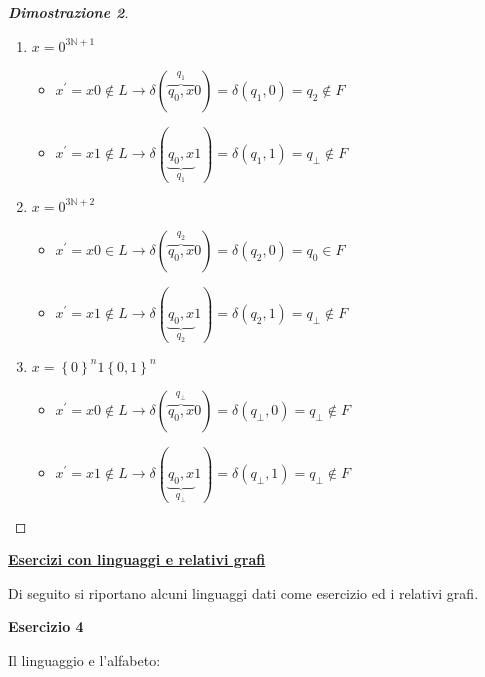 \documentclass[a4paper]{article}
\begin{document}
\begin{proof}[\textcolor{Blue3}{\textbf{Dimostrazione 2}}]
		\begin{enumerate}[label=\alph*.]
			\item $x = 0^{3\mathbb{N} + 1}$
			\begin{itemize}
				\item $x^{'} = x0 \notin L \longrightarrow \delta(\overbrace{q_{0}, x}^{q_{1}} 0) = \delta\left(q_{1}, 0\right) = q_{2} \notin F$
				\item $x^{'} = x1 \notin L \longrightarrow \delta(\underbrace{q_{0}, x}_{q_{1}} 1) = \delta\left(q_{1}, 1\right) = q_{\bot} \notin F$
			\end{itemize}
			
			\item $x = 0^{3\mathbb{N} + 2}$
			\begin{itemize}
				\item $x^{'} = x0 \in L \longrightarrow \delta(\overbrace{q_{0}, x}^{q_{2}} 0) = \delta\left(q_{2}, 0\right) = q_{0} \in F$
				\item $x^{'} = x1 \notin L \longrightarrow \delta(\underbrace{q_{0}, x}_{q_{2}} 1) = \delta\left(q_{2}, 1\right) = q_{\bot} \notin F$
			\end{itemize}
		
			\item $x = \left\{0\right\}^{n} 1 \left\{0, 1\right\}^{n}$
			\begin{itemize}
				\item $x^{'} = x0 \notin L \longrightarrow \delta(\overbrace{q_{0}, x}^{q_{\bot}} 0) = \delta\left(q_{\bot}, 0\right) = q_{\bot} \notin F$
				\item $x^{'} = x1 \notin L \longrightarrow \delta(\underbrace{q_{0}, x}_{q_{\bot}} 1) = \delta\left(q_{\bot}, 1\right) = q_{\bot} \notin F$
			\end{itemize}
		\end{enumerate}
	\end{proof}

	\newpage

	\noindent
	\textcolor{Red3}{\textbf{\underline{Esercizi con linguaggi e relativi grafi}}}\newline
	
	\noindent
	Di seguito si riportano alcuni linguaggi dati come esercizio ed i relativi grafi.\newline
	
	\noindent
	\textcolor{Red3}{\textbf{Esercizio 4}}\newline
	
	\noindent
	Il linguaggio e l'alfabeto:
	
\end{document}
